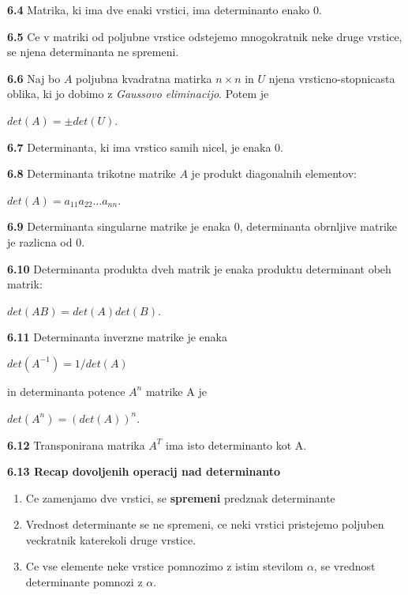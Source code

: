 \documentclass{article}
\begin{document}
\begin{multicols}{3}
\textbf{6.4} Matrika, ki ima dve enaki vrstici, ima determinanto enako 0.

\textbf{6.5} Ce v matriki od poljubne vrstice odstejemo mnogokratnik neke druge vrstice,
se njena determinanta ne spremeni.

\textbf{6.6} Naj bo $A$ poljubna kvadratna matirka $n \times n$ in $U$ njena vrsticno-stopnicasta
oblika, ki jo dobimo z \textit{Gaussovo eliminacijo}. Potem je 
\begin{center}
    $det(A) = \pm det(U)$.
\end{center}

\textbf{6.7} Determinanta, ki ima vrstico samih nicel, je enaka 0.

\textbf{6.8} Determinanta trikotne matrike $A$ je produkt diagonalnih elementov:
\begin{center}
    $det(A) = a_{11}a_{22} \hdots a_{nn}$.
\end{center}

\textbf{6.9} Determinanta singularne matrike je enaka 0, determinanta obrnljive matrike je razlicna od 0.

\textbf{6.10} Determinanta produkta dveh matrik je enaka produktu determinant obeh matrik:
\begin{center}
    $det(AB) = det(A)det(B)$.
\end{center}

\textbf{6.11} Determinanta inverzne matrike je enaka
\begin{center}
    $det(A^{-1}) = 1/det(A)$
\end{center}
in determinanta potence $A^{n}$ matrike A je
\begin{center}
    $det(A^{n}) = (det(A))^{n}$.
\end{center}

\textbf{6.12} Transponirana matrika $A^{T}$ ima isto determinanto kot A.

\textbf{6.13 Recap dovoljenih operacij nad determinanto}
\begin{enumerate}
    \item Ce zamenjamo dve vrstici, se \textbf{spremeni} predznak determinante
    \item Vrednost determinante se ne spremeni, ce neki vrstici pristejemo poljuben veckratnik katerekoli druge vrstice.
    \item Ce vse elemente neke vrstice pomnozimo z istim stevilom $\alpha$, se vrednost determinante pomnozi z $\alpha$.
\end{enumerate}


\end{multicols}
\end{document}
